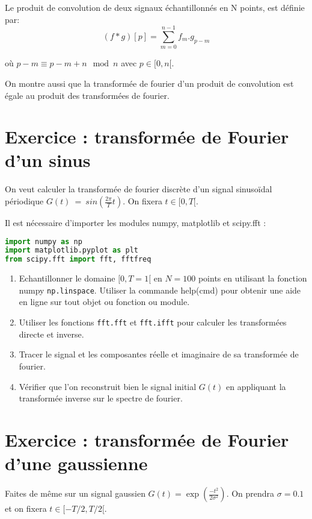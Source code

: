 \documentclass[a4paper, 12pt]{article}
\begin{document}
Le produit de convolution de deux signaux échantillonnés en N points,   est définie par:
\begin{equation} 
(f*g)[p]=\sum_{m=0}^{n-1} f_m  . g_{p-m}
\label{convolution}
\end{equation}

où $p-m \equiv p-m+n \mod n$
avec $p \in [0, n[$.

On montre aussi que la transformée de fourier d'un produit de convolution est égale au produit des
transformées de fourier.

\section{Exercice : transformée de Fourier d'un sinus}

On veut calculer la transformée de fourier discrète d'un signal sinusoïdal périodique $G(t)~=~sin(\frac{2\pi}{T} t)$. On fixera $t \in [0, T[$.

Il est nécessaire d'importer les modules numpy, matplotlib et scipy.fft :

\begin{lstlisting}[language=Python]
%matplotlib inline
import numpy as np
import matplotlib.pyplot as plt
from scipy.fft import fft, fftfreq
\end{lstlisting}

\begin{enumerate} 
\item Echantillonner le domaine $ [0, T=1[$ en $N=100$ points en utilisant la fonction numpy
{\tt np.linspace}. Utiliser la commande help(cmd) pour obtenir une aide en ligne sur tout objet ou
fonction ou module.
\item Utiliser les fonctions {\tt fft.fft} et {\tt fft.ifft} pour calculer 
les transformées directe et inverse.
\item Tracer le signal et les composantes réelle et imaginaire de sa transformée de fourier.
\item Vérifier que l'on reconstruit bien le signal initial $G(t)$ en appliquant la transformée inverse 
sur le spectre de fourier.
\end{enumerate} 

\section{Exercice : transformée de Fourier d'une gaussienne}

Faites de même sur un signal gaussien $G(t)=\exp(\frac{-t^2}{2 \sigma^2})$.
On prendra $\sigma=0.1$ et on fixera $t \in [-T/2, T/2[$.
\end{document}
